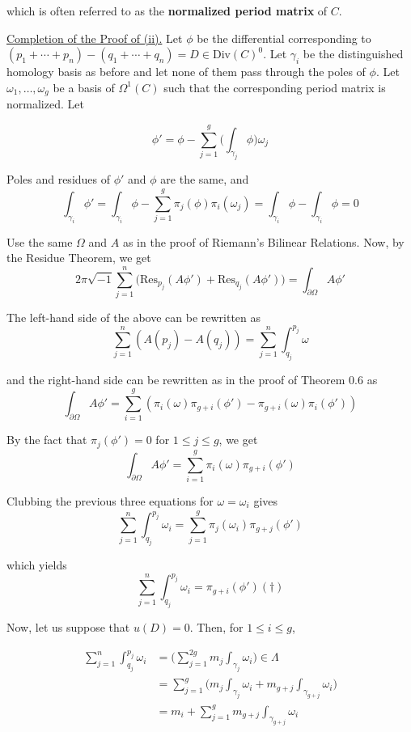 \documentclass[11pt,a4paper]{article}
\begin{document}
which is often referred to as the \textbf{normalized period matrix} of $C$.

\underline{Completion of the Proof of (ii).} Let $\phi$ be the differential corresponding to $(p_1+\cdots+p_n) - (q_1+\cdots+q_n) = D \in \text{Div}(C)^0$. Let $\gamma_i$ be the distinguished homology basis as before and let none of them pass through the poles of $\phi$. Let $\omega_1, \ldots, \omega_g$ be a basis of $\Omega^1(C)$ such that the corresponding period matrix is normalized. Let

$$\phi' = \phi - \sum_{j=1}^{g}\bigg(\int_{\gamma_j}\phi\bigg)\omega_j$$

Poles and residues of $\phi'$ and $\phi$ are the same, and
$$\int_{\gamma_i}\phi' = \int_{\gamma_i}\phi - \sum_{j=1}^{g}\pi_j(\phi)\pi_i(\omega_j) = \int_{\gamma_i}\phi - \int_{\gamma_i}\phi = 0$$

Use the same $\Omega$ and $A$ as in the proof of Riemann's Bilinear Relations. Now, by the Residue Theorem, we get
$$2\pi \sqrt{-1}\sum_{j=1}^{n}\big(\text{Res}_{p_j}(A\phi') + \text{Res}_{q_j}(A\phi')\big) =  \int_{\partial\Omega}A\phi'$$

The left-hand side of the above can be rewritten as
$$\sum_{j=1}^{n}(A(p_j) - A(q_j)) = \sum_{j=1}^{n}\int_{q_j}^{p_j}\omega$$

and the right-hand side can be rewritten as in the proof of Theorem 0.6 as
$$\int_{\partial\Omega}A\phi' = \sum_{i=1}^{g}(\pi_i(\omega)\pi_{g+i}(\phi') - \pi_{g+i}(\omega)\pi_i(\phi'))$$

By the fact that $\pi_j(\phi') = 0$ for $1\leq j\leq g$, we get
$$\int_{\partial\Omega}A\phi' = \sum_{i=1}^{g}\pi_i(\omega)\pi_{g+i}(\phi')$$

Clubbing the previous three equations for $\omega = \omega_i$ gives
$$\sum_{j=1}^{n}\int_{q_j}^{p_j}\omega_i = \sum_{j=1}^{g}\pi_j(\omega_i)\pi_{g+j}(\phi')$$

which yields
$$\sum_{j=1}^{n}\int_{q_j}^{p_j}\omega_i = \pi_{g+i}(\phi')   (\dagger)$$

Now, let us suppose that $u(D) = 0$. Then, for $1\leq i\leq g$,
\begin{center}
\begin{equation*}
        \begin{aligned}
            \sum_{j=1}^{n}\int_{q_j}^{p_j}\omega_i &= \bigg(\sum_{j=1}^{2g}m_j\int_{\gamma_j}\omega_i\bigg) \in \Lambda \\
            &= \sum_{j=1}^{g}\bigg(m_j\int_{\gamma_j}\omega_i + m_{g+j}\int_{\gamma_{g+j}}\omega_i\bigg)\\
            &= m_i + \sum_{j=1}^{g} m_{g+j}\int_{\gamma_{g+j}}\omega_i
        \end{aligned}
\end{equation*}
\end{center}
\end{document}
